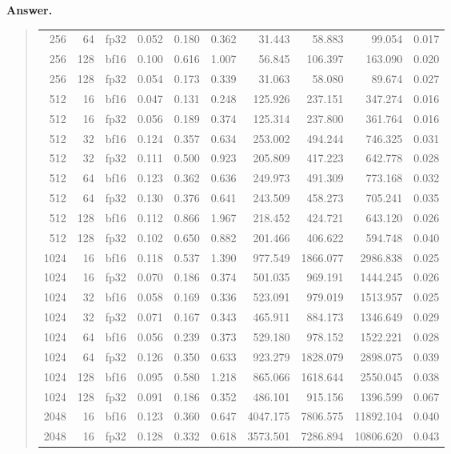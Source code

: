 \documentclass[11pt]{article}
\newenvironment{answer}{%
  \vspace{0.3em}%
  \noindent\textbf{Answer.}\begin{quote}%
}{%
  \end{quote}\vspace{0.4em}%
}
\begin{document}
\begin{answer}
\begin{table}[H]
{\begin{tabular}{@{}rrlrrrrrrr@{}}
    256 & 64 & fp32 & 0.052 & 0.180 & 0.362 & 31.443 & 58.883 & 99.054 & 0.017 \\
    256 & 128 & bf16 & 0.100 & 0.616 & 1.007 & 56.845 & 106.397 & 163.090 & 0.020 \\
    256 & 128 & fp32 & 0.054 & 0.173 & 0.339 & 31.063 & 58.080 & 89.674 & 0.027 \\
    512 & 16 & bf16 & 0.047 & 0.131 & 0.248 & 125.926 & 237.151 & 347.274 & 0.016 \\
    512 & 16 & fp32 & 0.056 & 0.189 & 0.374 & 125.314 & 237.800 & 361.764 & 0.016 \\
    512 & 32 & bf16 & 0.124 & 0.357 & 0.634 & 253.002 & 494.244 & 746.325 & 0.031 \\
    512 & 32 & fp32 & 0.111 & 0.500 & 0.923 & 205.809 & 417.223 & 642.778 & 0.028 \\
    512 & 64 & bf16 & 0.123 & 0.362 & 0.636 & 249.973 & 491.309 & 773.168 & 0.032 \\
    512 & 64 & fp32 & 0.130 & 0.376 & 0.641 & 243.509 & 458.273 & 705.241 & 0.035 \\
    512 & 128 & bf16 & 0.112 & 0.866 & 1.967 & 218.452 & 424.721 & 643.120 & 0.026 \\
    512 & 128 & fp32 & 0.102 & 0.650 & 0.882 & 201.466 & 406.622 & 594.748 & 0.040 \\
    1024 & 16 & bf16 & 0.118 & 0.537 & 1.390 & 977.549 & 1866.077 & 2986.838 & 0.025 \\
    1024 & 16 & fp32 & 0.070 & 0.186 & 0.374 & 501.035 & 969.191 & 1444.245 & 0.026 \\
    1024 & 32 & bf16 & 0.058 & 0.169 & 0.336 & 523.091 & 979.019 & 1513.957 & 0.025 \\
    1024 & 32 & fp32 & 0.071 & 0.167 & 0.343 & 465.911 & 884.173 & 1346.649 & 0.029 \\
    1024 & 64 & bf16 & 0.056 & 0.239 & 0.373 & 529.180 & 978.152 & 1522.221 & 0.028 \\
    1024 & 64 & fp32 & 0.126 & 0.350 & 0.633 & 923.279 & 1828.079 & 2898.075 & 0.039 \\
    1024 & 128 & bf16 & 0.095 & 0.580 & 1.218 & 865.066 & 1618.644 & 2550.045 & 0.038 \\
    1024 & 128 & fp32 & 0.091 & 0.186 & 0.352 & 486.101 & 915.156 & 1396.599 & 0.067 \\
    2048 & 16 & bf16 & 0.123 & 0.360 & 0.647 & 4047.175 & 7806.575 & 11892.104 & 0.040 \\
    2048 & 16 & fp32 & 0.128 & 0.332 & 0.618 & 3573.501 & 7286.894 & 10806.620 & 0.043 \\

\end{tabular}}
\end{table}
\end{answer}
\end{document}
